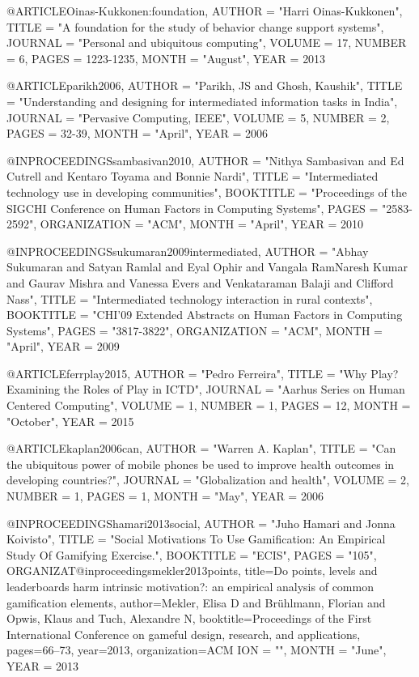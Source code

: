 @ARTICLE{Oinas-Kukkonen:foundation,
	AUTHOR = "Harri Oinas-Kukkonen",
	TITLE = "A foundation for the study of behavior change support systems",
	JOURNAL = "Personal and ubiquitous computing",
	VOLUME = {17},
	NUMBER = {6},
	PAGES = {1223-1235},
	MONTH = "August",
	YEAR = {2013}	}


@ARTICLE{parikh2006,
	AUTHOR = "Parikh, JS and Ghosh, Kaushik",
	TITLE = "Understanding and designing for intermediated information tasks in India",
	JOURNAL = "Pervasive Computing, IEEE",
	VOLUME = {5},
	NUMBER = {2},
	PAGES = {32-39},
	MONTH = "April",
	YEAR = {2006}	}

@INPROCEEDINGS{sambasivan2010,
	AUTHOR = "Nithya Sambasivan and Ed Cutrell and Kentaro Toyama and Bonnie Nardi",
	TITLE = "Intermediated technology use in developing communities",
	BOOKTITLE = "Proceedings of the SIGCHI Conference on Human Factors in Computing Systems",
	PAGES = "2583-2592",
	ORGANIZATION = "ACM",
	MONTH = "April", 
	YEAR = {2010}	}

@INPROCEEDINGS{sukumaran2009intermediated,
	AUTHOR = "Abhay Sukumaran and Satyan Ramlal and Eyal Ophir and Vangala RamNaresh Kumar and Gaurav Mishra and Vanessa Evers and  Venkataraman Balaji and Clifford Nass",
	TITLE = "Intermediated technology interaction in rural contexts",
	BOOKTITLE = "CHI'09 Extended Abstracts on Human Factors in Computing Systems",
	PAGES = "3817-3822",
	ORGANIZATION = "ACM",
	MONTH = "April", 
	YEAR = {2009}	}

@ARTICLE{ferrplay2015,
	AUTHOR = "Pedro Ferreira",
	TITLE = "Why Play? Examining the Roles of Play in ICTD",
	JOURNAL = "Aarhus Series on Human Centered Computing",
	VOLUME = {1},
	NUMBER = {1},
	PAGES = {12},
	MONTH = "October",
	YEAR = {2015}	}

@ARTICLE{kaplan2006can,
	AUTHOR = "Warren A. Kaplan",
	TITLE = "Can the ubiquitous power of mobile phones be used to improve health outcomes in developing countries?",
	JOURNAL = "Globalization and health",
	VOLUME = {2},
	NUMBER = {1},
	PAGES = {1},
	MONTH = "May",
	YEAR = {2006}	}

@INPROCEEDINGS{hamari2013social,
	AUTHOR = "Juho Hamari and Jonna Koivisto",
	TITLE = "Social Motivations To Use Gamification: An Empirical Study Of Gamifying Exercise.",
	BOOKTITLE = "ECIS",
	PAGES = "105",
	ORGANIZAT@inproceedings{mekler2013points,
  title={Do points, levels and leaderboards harm intrinsic motivation?: an empirical analysis of common gamification elements},
  author={Mekler, Elisa D and Br{\"u}hlmann, Florian and Opwis, Klaus and Tuch, Alexandre N},
  booktitle={Proceedings of the First International Conference on gameful design, research, and applications},
  pages={66--73},
  year={2013},
  organization={ACM}
}
ION = "",
	MONTH = "June", 
	YEAR = {2013}	}


